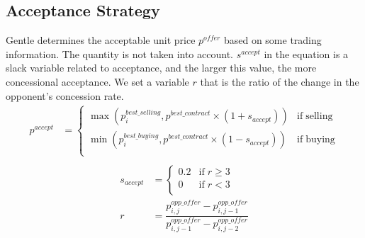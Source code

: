 \documentclass[uplatex, 10pt, a4j]{jsarticle}
\begin{document}
\subsection{\textrm{Acceptance Strategy}}
Gentle determines the acceptable unit price $p^{offer}$ based on some trading information. The quantity is not taken into account.
$s^{accept}$ in the equation is a slack variable related to acceptance, and the larger this value, the more concessional acceptance.
We set a variable $r$ that is the ratio of the change in the opponent's concession rate.
\begin{equation*}
    \begin{split}
        p^{accept} &= \left\{\begin{array}{ll}
            \max \left(p^{best\_selling}_{i}, p^{best\_contract} \times \left(1+s_{accept}\right) \right) & \mathrm{if \; selling} \\ [3mm]
            \min \left(p^{best\_buying}_{i}, p^{best\_contract} \times \left(1-s_{accept}\right) \right)  & \mathrm{if \; buying}  \\
        \end{array}\right. \\
    \end{split}
\end{equation*}
\begin{equation*}
    \begin{split}
        s_{accept} &= \left\{\begin{array}{ll}
            0.2 & \mathrm{if} \; r \geq 3 \\
            0   & \mathrm{if} \; r < 3    \\
        \end{array}\right. \\
        r &= \dfrac{p^{opp\_offer}_{i,j} - p^{opp\_offer}_{i,j-1}}{p^{opp\_offer}_{i,j-1} - p^{opp\_offer}_{i,j-2}} \\
    \end{split}
\end{equation*}
\end{document}

